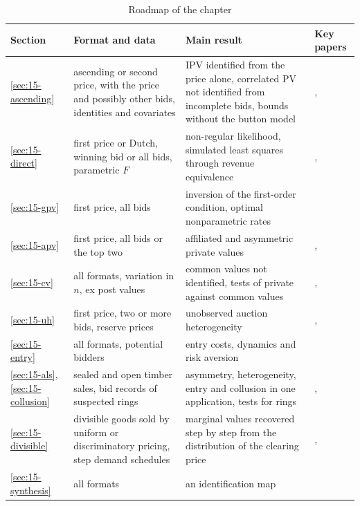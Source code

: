\begin{table}[htbp]
\centering
\caption{Roadmap of the chapter}\label{tab:15-roadmap}
\footnotesize
\begin{tabularx}{\textwidth}{@{}>{\raggedright\arraybackslash}p{1.35cm}>{\raggedright\arraybackslash}X>{\raggedright\arraybackslash}X>{\raggedright\arraybackslash}p{3.1cm}@{}}
\toprule
Section & Format and data & Main result & Key papers \\
\midrule
\ref{sec:15-ascending} & ascending or second price, with the price and possibly other bids, identities and
covariates & IPV identified from the price alone, correlated PV not identified from incomplete bids, bounds without
the button model & \citet{AtheyHaile2002}, \citet{HaileTamer2003} \\
\addlinespace
\ref{sec:15-direct} & first price or Dutch, winning bid or all bids, parametric $F$ & non-regular likelihood, simulated
least squares through revenue equivalence & \citet{DonaldPaarsch1996}, \citet{LaffontOssardVuong1995} \\
\addlinespace
\ref{sec:15-gpv} & first price, all bids & inversion of the first-order condition, optimal nonparametric rates &
\citet{GuerrePerrigneVuong2000} \\
\addlinespace
\ref{sec:15-apv} & first price, all bids or the top two & affiliated and asymmetric private values &
\citet{LiPerrigneVuong2002}, \citet{CampoPerrigneVuong2003} \\
\addlinespace
\ref{sec:15-cv} & all formats, variation in $n$, ex post values & common values not identified, tests of private
against common values & \citet{AtheyHaile2002}, \citet{HendricksPorter1988} \\
\addlinespace
\ref{sec:15-uh} & first price, two or more bids, reserve prices & unobserved auction heterogeneity &
\citet{Krasnokutskaya2011}, \citet{Roberts2013} \\
\addlinespace
\ref{sec:15-entry} & all formats, potential bidders & entry costs, dynamics and risk aversion &
\citet{JofreBonetPesendorfer2003} \\
\addlinespace
\ref{sec:15-als}, \ref{sec:15-collusion} & sealed and open timber sales, bid records of suspected rings &
asymmetry, heterogeneity, entry and collusion in one application, tests for rings &
\citet{AtheyLevinSeira2011}, \citet{MarshallMarx2012} \\
\addlinespace
\ref{sec:15-divisible} & divisible goods sold by uniform or discriminatory pricing, step demand schedules &
marginal values recovered step by step from the distribution of the clearing price &
\citet{Kastl2011}, \citet{CassolaHortacsuKastl2013} \\
\addlinespace
\ref{sec:15-synthesis} & all formats & an identification map & \citet{AtheyHaile2007} \\
\bottomrule
\end{tabularx}
\end{table}

